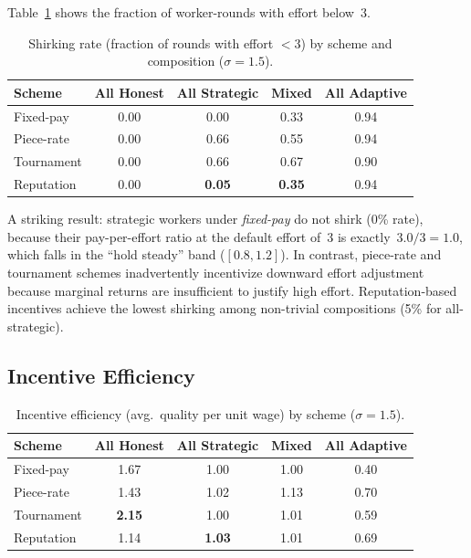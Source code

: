 \documentclass[11pt]{article}
\begin{document}
Table~\ref{tab:shirking} shows the fraction of worker-rounds with effort below~3.

\begin{table}[h]
\centering
\small
\caption{Shirking rate (fraction of rounds with effort $< 3$) by scheme and composition ($\sigma = 1.5$).}
\label{tab:shirking}
\begin{tabular}{lcccc}
\toprule
\textbf{Scheme} & \textbf{All Honest} & \textbf{All Strategic} & \textbf{Mixed} & \textbf{All Adaptive} \\
\midrule
Fixed-pay    & 0.00 & 0.00 & 0.33 & 0.94 \\
Piece-rate   & 0.00 & 0.66 & 0.55 & 0.94 \\
Tournament   & 0.00 & 0.66 & 0.67 & 0.90 \\
Reputation   & 0.00 & \textbf{0.05} & \textbf{0.35} & 0.94 \\
\bottomrule
\end{tabular}
\end{table}

A striking result: strategic workers under \emph{fixed-pay} do not shirk (0\% rate), because their pay-per-effort ratio at the default effort of~3 is exactly~$3.0/3 = 1.0$, which falls in the ``hold steady'' band ($[0.8, 1.2]$).
In contrast, piece-rate and tournament schemes inadvertently incentivize downward effort adjustment because marginal returns are insufficient to justify high effort.
Reputation-based incentives achieve the lowest shirking among non-trivial compositions (5\% for all-strategic).

\subsection{Incentive Efficiency}

\begin{table}[h]
\centering
\small
\caption{Incentive efficiency (avg.\ quality per unit wage) by scheme ($\sigma = 1.5$).}
\label{tab:efficiency}
\begin{tabular}{lcccc}
\toprule
\textbf{Scheme} & \textbf{All Honest} & \textbf{All Strategic} & \textbf{Mixed} & \textbf{All Adaptive} \\
\midrule
Fixed-pay    & 1.67 & 1.00 & 1.00 & 0.40 \\
Piece-rate   & 1.43 & 1.02 & 1.13 & 0.70 \\
Tournament   & \textbf{2.15} & 1.00 & 1.01 & 0.59 \\
Reputation   & 1.14 & \textbf{1.03} & 1.01 & 0.69 \\
\bottomrule
\end{tabular}
\end{table}
\end{document}
